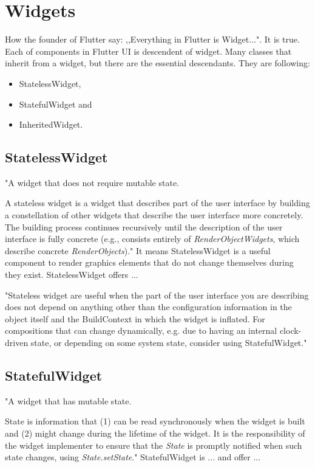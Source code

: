 \section{Widgets}\label{sec:widgets}
How the founder of Flutter say: ,,Everything in Flutter is Widget...".
It is true. %
Each of components in Flutter UI is descendent of widget.
Many classes that inherit from a widget, but there are the essential descendants.
They are following:
\begin{itemize}
    \item StatelessWidget,
    \item StatefulWidget and
    \item InheritedWidget.
\end{itemize}{}

\subsection{StatelessWidget}\label{subsec:statelesswidget}
"A widget that does not require mutable state.

A stateless widget is a widget that describes part of the user interface by building a constellation of other widgets that describe the user interface more concretely.
The building process continues recursively until the description of the user interface is fully concrete (e.g., consists entirely of
\textit{RenderObjectWidgets}\cite{renderObjectWidget}, which describe concrete \textit{RenderObjects}\cite{renderObject})."\cite{statelessWidget}
It means StatelessWidget is a useful component to render graphics elements that do not change themselves during they exist.
StatelessWidget offers ...  %

"Stateless widget are useful when the part of the user interface you are describing does not depend on anything other than the configuration information in the object itself and the BuildContext in which the widget is inflated.
For compositions that can change dynamically, e.g. due to having an internal clock-driven state, or depending on some system state, consider using StatefulWidget."\cite{statelessWidget}

\subsection{StatefulWidget}\label{subsec:statefulwidget}
"A widget that has mutable state.

State is information that (1) can be read synchronously when the widget is built and (2) might change during the lifetime of the widget.
It is the responsibility of the widget implementer to ensure that the \textit{State}\cite{state} is promptly notified when such state changes, using \textit{State.setState}\cite{setState}."\cite{statefulWidget}
StatefulWidget is ... and offer ... %

